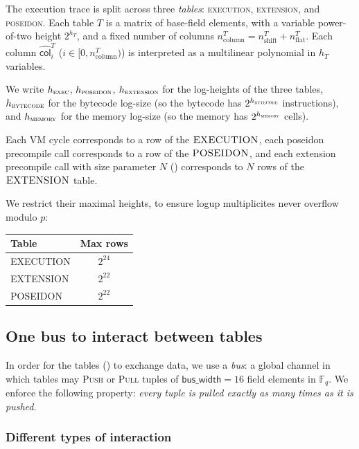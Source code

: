 \documentclass{article}
\theoremstyle{definition}
\newcommand{\Fq}{\mathbb F_q}
\begin{document}
The execution trace is split across three \textit{tables}: \textsc{execution}, \textsc{extension}, and \textsc{poseidon}. Each table $T$ is a matrix of base-field elements, with a variable power-of-two height $2^{h_T}$, and a fixed number of columns $n_\text{column}^T = n_\text{shift}^T + n_\text{flat}^T$. Each column $\hat{\textsf{col}}^T_i$ ($i \in [0, n_\text{column}^T)$) is interpreted as a multilinear polynomial in ${h_T}$ variables.

We write $h_\textsc{exec}$, $h_\textsc{poseidon}$, $h_\textsc{extension}$ for the log-heights of the three tables, $h_\textsc{bytecode}$ for the bytecode log-size (so the bytecode has $2^{h_\textsc{bytecode}}$ instructions), and $h_\textsc{memory}$ for the memory log-size (so the memory has $2^{h_\textsc{memory}}$ cells).

Each VM cycle corresponds to a row of the $\textsc{EXECUTION}$, each poseidon precompile call corresponds to a row of the $\textsc{POSEIDON}$, and each extension precompile call with size parameter $N$ () corresponds to $N$ rows of the $\textsc{EXTENSION}$ table.

We restrict their maximal heights, to ensure logup multiplicites never overflow modulo $p$:

\begin{center}
\begin{tabular}{lc}
\toprule
Table & Max rows \\
\midrule
\textsc{EXECUTION} & $2^{24}$ \\
\textsc{EXTENSION} & $2^{22}$ \\
\textsc{POSEIDON} & $2^{22}$ \\
\bottomrule
\end{tabular}
\end{center}

\subsection{One bus to interact between tables}\label{sec:bus-interactions}


In order for the tables () to exchange data, we use a \emph{bus}: a global channel in which tables may \textsc{Push} or \textsc{Pull} tuples of $\textsf{bus\_width} = 16$ field elements in $\Fq$. We enforce the following property: \textit{every tuple is pulled exactly as many times as it is pushed}.

\subsubsection{Different types of interaction}
\end{document}
